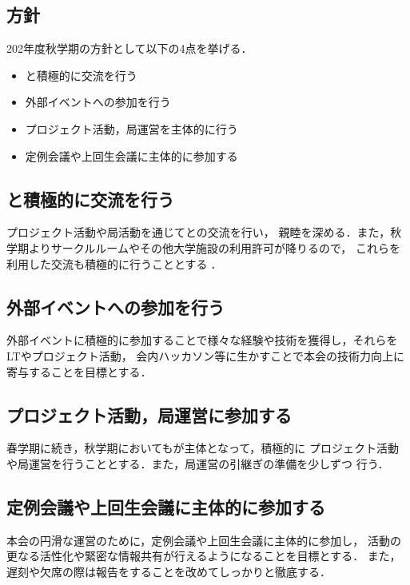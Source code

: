\subsection*{\newGradeIfKouki{}\secondGrade{}方針}


202年度秋学期の\secondGrade{}方針として以下の4点を挙げる．

\begin{itemize}
    \item \firstGrade{}と積極的に交流を行う
    \item 外部イベントへの参加を行う
    \item プロジェクト活動，局運営を主体的に行う
    \item 定例会議や上回生会議に主体的に参加する
\end{itemize}

\subsection*{\firstGrade{}と積極的に交流を行う}
プロジェクト活動や局活動を通じて\firstGrade{}との交流を行い，
親睦を深める．また，秋学期よりサークルルームやその他大学施設の利用許可が降りるので，
これらを利用した交流も積極的に行うこととする．

\subsection*{外部イベントへの参加を行う}
外部イベントに積極的に参加することで様々な経験や技術を獲得し，それらをLTやプロジェクト活動，
会内ハッカソン等に生かすことで本会の技術力向上に寄与することを目標とする．

\subsection*{プロジェクト活動，局運営に参加する}
春学期に続き，秋学期においても\secondGrade{}が主体となって，積極的に
プロジェクト活動や局運営を行うこととする．また，局運営の引継ぎの準備を少しずつ
行う．

\subsection*{定例会議や上回生会議に主体的に参加する}
本会の円滑な運営のために，定例会議や上回生会議に主体的に参加し，
活動の更なる活性化や緊密な情報共有が行えるようになることを目標とする．
また，遅刻や欠席の際は報告をすることを改めてしっかりと徹底する．
